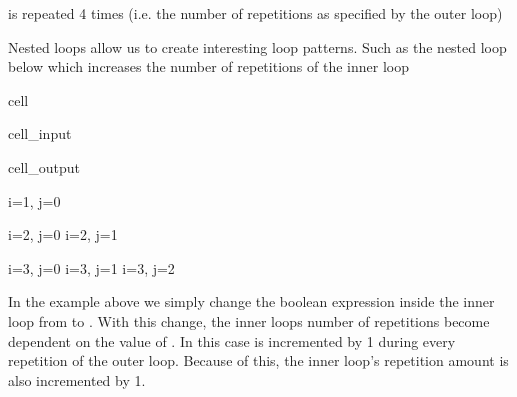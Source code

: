 \documentclass[letterpaper,10pt,english]{jupyterBook}
\begin{document}
\sphinxAtStartPar
is repeated 4 times (i.e. the number of repetitions as specified by the outer loop)

\sphinxAtStartPar
Nested loops allow us to create interesting loop patterns. Such as the nested loop below which increases the number of repetitions of the inner loop

\begin{sphinxuseclass}{cell}\begin{sphinxVerbatimInput}

\begin{sphinxuseclass}{cell_input}
\begin{sphinxVerbatim}[commandchars=\\\{\}]
  
   
      
        
                
            
     
        
\end{sphinxVerbatim}

\end{sphinxuseclass}\end{sphinxVerbatimInput}
\begin{sphinxVerbatimOutput}

\begin{sphinxuseclass}{cell_output}
\begin{sphinxVerbatim}[commandchars=\\\{\}]
i=1, j=0

i=2, j=0
i=2, j=1

i=3, j=0
i=3, j=1
i=3, j=2
\end{sphinxVerbatim}

\end{sphinxuseclass}\end{sphinxVerbatimOutput}

\end{sphinxuseclass}
\sphinxAtStartPar
In the example above we simply change the boolean expression inside the inner loop from  to . With this change, the inner loops number of repetitions become dependent on the value of . In this case  is incremented by 1 during every repetition of the outer loop. Because of this, the inner loop’s repetition amount is also incremented by 1.
\end{document}
